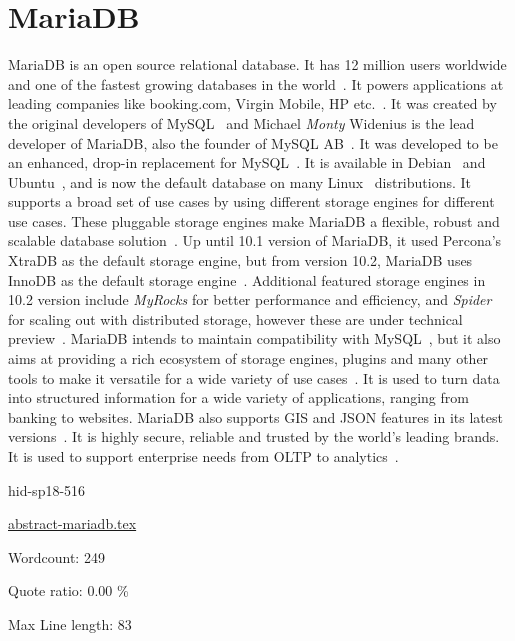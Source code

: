 \section{MariaDB}


MariaDB is an open source relational database. It has 12 million users worldwide 
and one of the fastest growing databases in the 
world~\cite{hid-sp18-516-www-mariadb}. It powers applications at leading 
companies like booking.com, Virgin Mobile, HP 
etc.~\cite{hid-sp18-516-www-mariadb}. It was created by the original developers
of MySQL~\cite{hid-sp18-516-www-wiki-mysql} and Michael \textit{Monty} Widenius 
is the lead developer of MariaDB, also the founder of MySQL 
AB~\cite{hid-sp18-516-www-wiki-mariadb}. It was developed to be an enhanced, 
drop-in replacement for MySQL~\cite{hid-sp18-516-www-mariadb-foundation}. It is 
available in Debian~\cite{hid-sp18-516-www-debian-org} and 
Ubuntu~\cite{hid-sp18-516-www-wiki-ubuntu}, and is now the default database on 
many Linux~\cite{hid-sp18-516-www-wiki-linux} distributions. It supports a broad 
set of use cases by using different storage engines for different use cases. These 
pluggable storage engines make MariaDB a flexible, robust and scalable database 
solution~\cite{hid-sp18-516-www-mariadb-server}. Up until 10.1 version of MariaDB, 
it used Percona's XtraDB as the default storage engine, but from version 10.2, 
MariaDB uses InnoDB as the default storage 
engine~\cite{hid-sp18-516-www-wiki-xtradb}. Additional featured storage engines
in 10.2 version include \textit{MyRocks} for better performance and efficiency,
and \textit{Spider} for scaling out with distributed storage, however these are
under technical preview~\cite{hid-sp18-516-www-mariadb-server}. MariaDB intends
to maintain compatibility with MySQL~\cite{hid-sp18-516-www-wiki-mariadb}, but
it also aims at providing a rich ecosystem of storage engines, plugins and many
other tools to make it versatile for a wide variety of use
cases~\cite{hid-sp18-516-www-mariadb-foundation}. It is used to turn data into
structured information for a wide variety of applications, ranging from banking
to websites. MariaDB also supports GIS and JSON features in its latest
versions~\cite{hid-sp18-516-www-mariadb-foundation}. It is highly secure,
reliable and trusted by the world's leading brands. It is used to support
enterprise needs from OLTP to analytics~\cite{hid-sp18-516-www-mariadb}.


\begin{IU}

hid-sp18-516

\href{https://github.com/cloudmesh-community/hid-sp18-516/blob/master//technology/abstract-mariadb.tex}{abstract-mariadb.tex}

 

Wordcount: 249


Quote ratio: 0.00 \%
 
Max Line length: 83
\end{IU}

